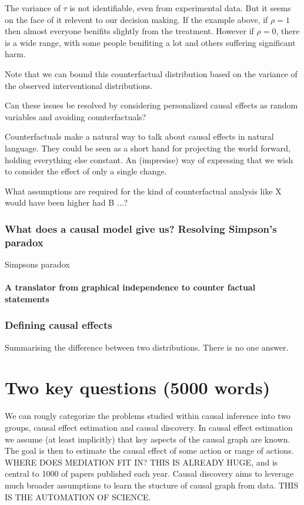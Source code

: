 \documentclass[11pt,a4paper,oneside]{book}
\begin{document}
The variance of $\tau$ is not identifiable, even from experimental data. But it seems on the face of it relevent to our decision making. If the example above, if $\rho = 1$ then almost everyone benifits slightly from the treatment. However if $\rho=0$, there is a wide range, with some people benifiting a lot and others suffering significant harm.  

Note that we can bound this counterfactual distribution based on the variance of the observed interventional distributions. 

Can these issues be resolved by considering personalized causal effects as random variables and avoiding counterfactuals?

Counterfactuals make a natural way to talk about causal effects in natural language. They could be seen as a short hand for projecting the world forward, holding everything else constant. An (impresise) way of expressing that we wish to consider the effect of only a single change. 

What assumptions are required for the kind of counterfactual analysis like X would have been higher had B ...?

\subsection*{What does a causal model give us? Resolving Simpson's paradox}

Simpsons paradox



\subsubsection{A translator from graphical independence to counter factual statements}
\subsection*{Defining causal effects} Summarising the difference between two distributions. There is no one answer. \cite{Janzing2013}

\chapter*{Two key questions (5000 words)}

We can rougly categorize the problems studied within causal inference into two groups, causal effect estimation and causal discovery. In causal effect estimation we assume (at least implicitly) that key aspects of the causal graph are known. The goal is then to estimate the causal effect of some action or range of actions. WHERE DOES MEDIATION FIT IN? THIS IS ALREADY HUGE, and is central to 1000 of papers published each year. Causal discovery aims to leverage much broader assumptions to learn the stucture of causal graph from data. THIS IS THE AUTOMATION OF SCIENCE.
\end{document}
